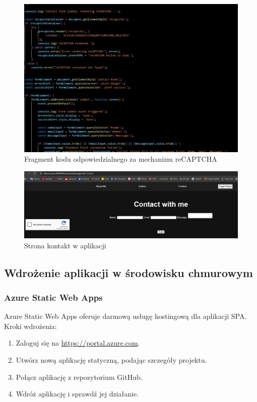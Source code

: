 \documentclass[a4paper,12pt]{article}
\begin{document}
\begin{figure}[H]
    \centering
    \includegraphics[width=1\textwidth]{images/recaptcha.png}
    \caption{Fragment kodu odpowiedzialnego za mechanizm reCAPTCHA}
\end{figure}

\begin{figure}[H]
    \centering
    \includegraphics[width=1\textwidth]{images/contact.png}
    \caption{Strona kontakt w aplikacji}
\end{figure}

\subsection{Wdrożenie aplikacji w środowisku chmurowym}
\subsubsection{Azure Static Web Apps}
Azure Static Web Apps oferuje darmową usługę hostingową dla aplikacji SPA. Kroki wdrożenia:
\begin{enumerate}
    \item Zaloguj się na \url{https://portal.azure.com}.
    \item Utwórz nową aplikację statyczną, podając szczegóły projektu.
    \item Połącz aplikację z repozytorium GitHub.
    \item Wdróż aplikację i sprawdź jej działanie.
\end{enumerate}
\end{document}
